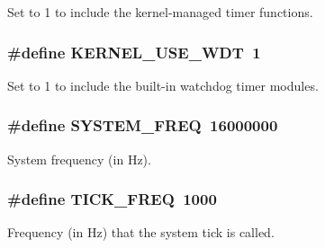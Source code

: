 Set to 1 to include the kernel-\/managed timer functions. 
\subsubsection[{KERNEL\_\-USE\_\-WDT}]{\setlength{\rightskip}{0pt plus 5cm}\#define KERNEL\_\-USE\_\-WDT~1}\label{kernelcfg_8h_a1b5add1d7c03ba5231f27a7f9df28953}


Set to 1 to include the built-\/in watchdog timer modules. 
\subsubsection[{SYSTEM\_\-FREQ}]{\setlength{\rightskip}{0pt plus 5cm}\#define SYSTEM\_\-FREQ~16000000}\label{kernelcfg_8h_ad3ff0eb20a978ec95129af1e401e2a59}


System frequency (in Hz). 
\subsubsection[{TICK\_\-FREQ}]{\setlength{\rightskip}{0pt plus 5cm}\#define TICK\_\-FREQ~1000}\label{kernelcfg_8h_a27e7c563065e8d600f40473a13c9f762}


Frequency (in Hz) that the system tick is called. 